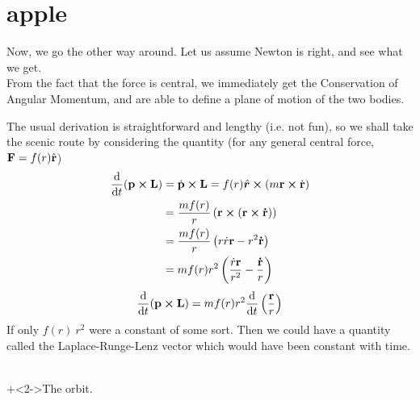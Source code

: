 \section{apple}

\frame{\sectionpage}

\begin{frame}
	Now, we go the other way around. Let us assume Newton is right, and see what we get. \\
	From the fact that the force is central, we immediately get the Conservation of Angular Momentum, and are able to define a plane of motion of the two bodies.\\
\end{frame}

\begin{frame}
	The usual derivation is straightforward and lengthy (i.e. not fun), so we shall take the scenic route by considering the quantity (for any general central force, $\vb{F}=f(r)\hat{\vb{r}}$)
	\begin{align*}
		\dv{t}(\vb{p}\cross\vb{L}) &= \dot{\vb{p}}\cross \vb{L} = f(r) \hat{\bm{r}}\cross(m\vb{r}\cross \dot{\vb{r}})\\
		&= \frac{mf(r)}{r} \left (\vb{r}\cross(\vb{r}\cross\vb{\dot{r}})\right)\\
		&= \frac{mf(r)}{r} \left(r\dot{r} \vb{r} - r^2\vb{\dot{r}}\right)\\
		&= mf(r)r^2\left (\frac{\dot{r}\vb{r}}{r^2}-\frac{\vb{\dot{r}}}{r}\right )
	\end{align*}
	\begin{equation*}
		\dv{t}(\vb{p}\cross\vb{L}) = mf(r)r^2\dv{t}\left (\frac{\vb{r}}{r}\right )
	\end{equation*}
	If only $f(r)\ r^2$ were a constant of some sort. Then we could have a quantity called the Laplace-Runge-Lenz vector which would have been constant with time.
\end{frame}

\begin{frame}
	
	\\[3\baselineskip]
	\onslide+<2->{The orbit.}	
\end{frame}

